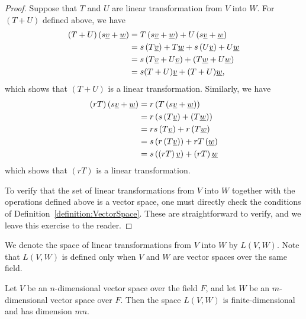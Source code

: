 \begin{proof}
Suppose that $T$ and $U$ are linear transformation from $V$ into $W$.
For $(T + U)$ defined above, we have
\begin{equation*}
\begin{split}
(T+U) \left( s \underline{v} + \underline{w} \right)
&= T \left( s \underline{v} + \underline{w} \right)
+ U \left( s \underline{v} + \underline{w} \right) \\
&= s \left( T \underline{v} \right) + T \underline{w}
+ s \left( U \underline{v} \right) + U \underline{w} \\
&= s \left( T \underline{v} + U \underline{v} \right)
+ \left( T \underline{w} + U \underline{w} \right) \\
&= s ( T + U ) \underline{v} + ( T + U ) \underline{w} ,
\end{split}
\end{equation*}
which shows that $(T+U)$ is a linear transformation.
Similarly, we have
\begin{equation*}
\begin{split}
(r T) \left( s \underline{v} + \underline{w} \right)
&= r \left( T \left( s \underline{v} + \underline{w} \right) \right) \\
&= r \left( s \left( T \underline{v} \right) + \left( T \underline{w} \right) \right) \\
&= r s \left( T \underline{v} \right) + r \left( T \underline{w} \right) \\
&= s \left( r \left( T \underline{v} \right) \right) + r T \left( \underline{w} \right) \\
&= s \left( \left( r T \right) \underline{v} \right) + \left( r T \right) \underline{w}
\end{split}
\end{equation*}
which shows that $(rT)$ is a linear transformation.

To verify that the set of linear transformations from $V$ into $W$ together with the operations defined above is a vector space, one must directly check the conditions of Definition~\ref{definition:VectorSpace}.
These are straightforward to verify, and we leave this exercise to the reader.
\end{proof}

We denote the space of linear transformations from $V$ into $W$ by $L(V,W)$.
Note that $L(V,W)$ is defined only when $V$ and $W$ are vector spaces over the same field.

\begin{fact}
Let $V$ be an $n$-dimensional vector space over the field $F$, and let $W$ be an $m$-dimensional vector space over $F$.
Then the space $L(V,W)$ is finite-dimensional and has dimension $mn$.
\end{fact}

